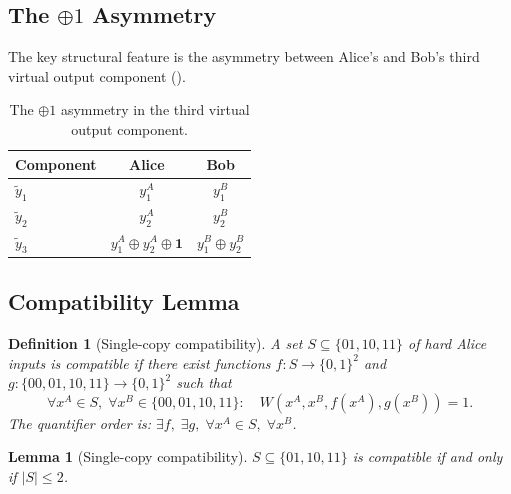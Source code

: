 \documentclass[11pt,letterpaper]{article}
\newtheorem{lemma}[theorem]{Lemma}
\newtheorem{definition}[theorem]{Definition}
\newcommand{\xor}{\oplus}
\begin{document}
\subsection{The $\xor 1$ Asymmetry}

The key structural feature is the asymmetry between Alice's and Bob's third virtual output component ().

\begin{table}[ht]
\centering
\caption{The $\xor 1$ asymmetry in the third virtual output component.}
\label{tab:asym}
\begin{tabular}{lcc}
\toprule
Component & Alice & Bob \\
\midrule
$\tilde{y}_1$ & $y_1^A$ & $y_1^B$ \\
$\tilde{y}_2$ & $y_2^A$ & $y_2^B$ \\
$\tilde{y}_3$ & $y_1^A \xor y_2^A \xor \mathbf{1}$ & $y_1^B \xor y_2^B$ \\
\bottomrule
\end{tabular}
\end{table}

\subsection{Compatibility Lemma}

\begin{definition}[Single-copy compatibility]
\label{def:compat}
A set $S \subseteq \{01,10,11\}$ of hard Alice inputs is \emph{compatible} if there exist functions $f : S \to \{0,1\}^2$ and $g : \{00,01,10,11\} \to \{0,1\}^2$ such that
\[
  \forall x^A \in S,\; \forall x^B \in \{00,01,10,11\}:\quad W(x^A, x^B, f(x^A), g(x^B)) = 1.
\]
The quantifier order is: $\exists f,\; \exists g,\; \forall x^A \in S,\; \forall x^B$.
\end{definition}

\begin{lemma}[Single-copy compatibility]
\label{lem:single}
$S \subseteq \{01,10,11\}$ is compatible if and only if $|S| \leq 2$.
\end{lemma}
\end{document}
